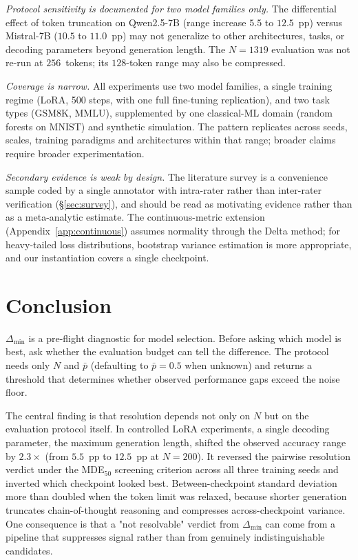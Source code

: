 \documentclass[pdflatex,sn-mathphys-ay,iicol]{sn-jnl}
\theoremstyle{thmstylethree}
\begin{document}
\begin{table}[t]
\begin{table}[t]
\emph{Protocol sensitivity is documented for two model families only.} The differential effect of token truncation on Qwen2.5-7B (range increase $5.5$ to $12.5$~pp) versus Mistral-7B ($10.5$ to $11.0$~pp) may not generalize to other architectures, tasks, or decoding parameters beyond generation length. The $N=1319$ evaluation was not re-run at $256$~tokens; its $128$-token range may also be compressed.

\emph{Coverage is narrow.} All experiments use two model families, a single training regime (LoRA, 500 steps, with one full fine-tuning replication), and two task types (GSM8K, MMLU), supplemented by one classical-ML domain (random forests on MNIST) and synthetic simulation. The pattern replicates across seeds, scales, training paradigms and architectures within that range; broader claims require broader experimentation.

\emph{Secondary evidence is weak by design.} The literature survey is a convenience sample coded by a single annotator with intra-rater rather than inter-rater verification (\S\ref{sec:survey}), and should be read as motivating evidence rather than as a meta-analytic estimate. The continuous-metric extension (Appendix~\ref{app:continuous}) assumes normality through the Delta method; for heavy-tailed loss distributions, bootstrap variance estimation is more appropriate, and our instantiation covers a single checkpoint.

\section{Conclusion}\label{sec:conclusion}

$\Delta_{\min}$ is a pre-flight diagnostic for model selection. Before asking which model is best, ask whether the evaluation budget can tell the difference. The protocol needs only $N$ and $\bar{p}$ (defaulting to $\bar{p}=0.5$ when unknown) and returns a threshold that determines whether observed performance gaps exceed the noise floor.

The central finding is that resolution depends not only on $N$ but on the evaluation protocol itself. In controlled LoRA experiments, a single decoding parameter, the maximum generation length, shifted the observed accuracy range by $2.3\times$ (from $5.5$~pp to $12.5$~pp at $N=200$). It reversed the pairwise resolution verdict under the MDE$_{50}$ screening criterion across all three training seeds and inverted which checkpoint looked best. Between-checkpoint standard deviation more than doubled when the token limit was relaxed, because shorter generation truncates chain-of-thought reasoning and compresses across-checkpoint variance. One consequence is that a "not resolvable" verdict from $\Delta_{\min}$ can come from a pipeline that suppresses signal rather than from genuinely indistinguishable candidates.


\end{table}
\end{table}
\end{document}
